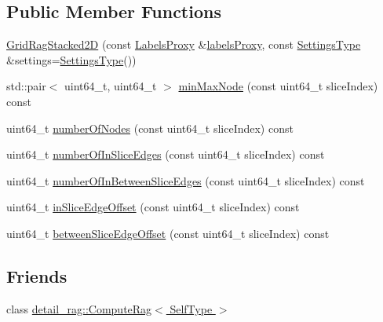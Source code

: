 \subsection*{Public Member Functions}
\begin{DoxyCompactItemize}
\item 
\hyperlink{classnifty_1_1graph_1_1GridRagStacked2D_a7dda5d4d4c9d873a6a52ae28b0bea026}{Grid\+Rag\+Stacked2D} (const \hyperlink{classnifty_1_1graph_1_1GridRagStacked2D_a09b44c819b97274a1025dc68cb6b3dc9}{Labels\+Proxy} \&\hyperlink{classnifty_1_1graph_1_1GridRag_a8589e44e41c12e7956d7d25a644c238e}{labels\+Proxy}, const \hyperlink{classnifty_1_1graph_1_1GridRagStacked2D_abc778dc9bd7c20bacba215c1fc64ffb5}{Settings\+Type} \&settings=\hyperlink{classnifty_1_1graph_1_1GridRagStacked2D_abc778dc9bd7c20bacba215c1fc64ffb5}{Settings\+Type}())
\item 
std\+::pair$<$ uint64\+\_\+t, uint64\+\_\+t $>$ \hyperlink{classnifty_1_1graph_1_1GridRagStacked2D_a7bdb0f41b431ee8af5dc62913758bb97}{min\+Max\+Node} (const uint64\+\_\+t slice\+Index) const
\item 
uint64\+\_\+t \hyperlink{classnifty_1_1graph_1_1GridRagStacked2D_a54fd293f9998c997db3730c1dedafbcc}{number\+Of\+Nodes} (const uint64\+\_\+t slice\+Index) const
\item 
uint64\+\_\+t \hyperlink{classnifty_1_1graph_1_1GridRagStacked2D_a0aae90dd0563e019e4295d9386807ff6}{number\+Of\+In\+Slice\+Edges} (const uint64\+\_\+t slice\+Index) const
\item 
uint64\+\_\+t \hyperlink{classnifty_1_1graph_1_1GridRagStacked2D_aafe568b79675d53123b156fc417be350}{number\+Of\+In\+Between\+Slice\+Edges} (const uint64\+\_\+t slice\+Index) const
\item 
uint64\+\_\+t \hyperlink{classnifty_1_1graph_1_1GridRagStacked2D_af902a51d2c59dbecacc8b175002945ee}{in\+Slice\+Edge\+Offset} (const uint64\+\_\+t slice\+Index) const
\item 
uint64\+\_\+t \hyperlink{classnifty_1_1graph_1_1GridRagStacked2D_acd82539263485e14536c46e6466d8d99}{between\+Slice\+Edge\+Offset} (const uint64\+\_\+t slice\+Index) const
\end{DoxyCompactItemize}
\subsection*{Friends}
\begin{DoxyCompactItemize}
\item 
class \hyperlink{classnifty_1_1graph_1_1GridRagStacked2D_abafcbd3543961eb6e4ee794aa6a62d66}{detail\+\_\+rag\+::\+Compute\+Rag$<$ Self\+Type $>$}
\end{DoxyCompactItemize}
